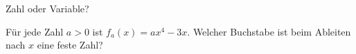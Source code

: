 \setcounter{aufgabe}{9}

\begin{aufgabe}{Zahl oder Variable?}
\begin{teile}
\teil Für jede Zahl $a > 0$ ist $f_a(x) = a x^4 - 3x$. Welcher Buchstabe ist beim Ableiten nach $x$ eine feste Zahl? \\  \\  \\ 
\end{teile}
\end{aufgabe}

